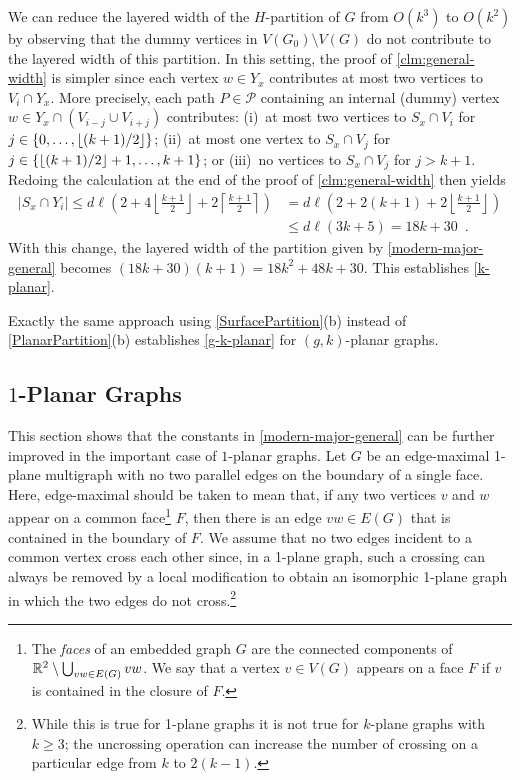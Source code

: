 \documentclass{patmorin}
\DeclarePairedDelimiter{\floor}{\lfloor}{\rfloor}
\renewcommand{\ge}{\geqslant}
\renewcommand{\le}{\leqslant}
\begin{document}
We can reduce the layered width of the $H$-partition of $G$ from $O(k^3)$ to $O(k^2)$ by observing that the dummy vertices in $V(G_0)\setminus V(G)$ do not contribute to the layered width of this partition.  In this setting, the proof of \cref{clm:general-width} is simpler since each vertex $w\in Y_x$ contributes at most two vertices to $V_i\cap Y_x$.  More precisely, each path $P\in\mathcal{P}$ containing an internal (dummy) vertex $w\in Y_x\cap (V_{i-j}\cup V_{i+j})$ contributes: (i)~at most two vertices to $S_x\cap V_i$ for $j\in\{0,\ldots,\floor{(k+1)/2}\}$; (ii)~at most one vertex to $S_x\cap V_j$ for $j\in\{\floor{(k+1)/2}+1,\ldots,k+1\}$; or (iii)~no vertices to $S_x\cap V_j$ for $j > k+1$.
Redoing the calculation at the end of the proof of \cref{clm:general-width} then yields 
\begin{align*}
    |S_x\cap Y_i| \le d\ell\left( 
       2 
       + 4\left\lfloor\frac{k+1}{2}\right\rfloor 
       + 2\left\lceil\frac{k+1}{2}\right\rceil
       \right)
       & =
       d\ell\left(
         2 + 2(k+1) + 2\left\lfloor\frac{k+1}{2}\right\rfloor
       \right) \\
       & \le
       d\ell(3k+5) 
      = 18k+30 \enspace .
\end{align*}    
With this change, the layered width of the partition given by \cref{modern-major-general} becomes $(18k+30)(k+1)=18k^2+48k+30$.  This establishes \cref{k-planar}.

Exactly the same approach using \cref{SurfacePartition}(b) instead of \cref{PlanarPartition}(b) establishes 
\cref{g-k-planar} for $(g,k)$-planar graphs. 


\subsection{\boldmath  $1$-Planar Graphs}
\label{sec-1-planar}

This section shows that the constants in \cref{modern-major-general} can be further improved in the important case of $1$-planar graphs. Let $G$ be an edge-maximal 1-plane multigraph with no two parallel edges on the boundary of a single face.  Here, edge-maximal should be taken to mean that, if any two vertices $v$ and $w$ appear on a common face\footnote{The \emph{faces} of an embedded graph $G$ are the connected components of $\mathbb{R}^2\setminus \bigcup_{vw\in E(G)} vw$.  We say that a vertex $v\in V(G)$ appears on a face $F$ if $v$ is contained in the closure of $F$.} $F$, then there is an edge $vw\in E(G)$ that is contained in the boundary of $F$.  We assume that no two edges incident to a common vertex cross each other since, in a 1-plane graph, such a crossing can always be removed by a local modification to obtain an isomorphic 1-plane graph in which the two edges do not cross.\footnote{While this is true for 1-plane graphs it is not true for $k$-plane graphs with $k\ge 3$; the uncrossing operation can increase the number of crossing on a particular edge from $k$ to $2(k-1)$.}
\end{document}
